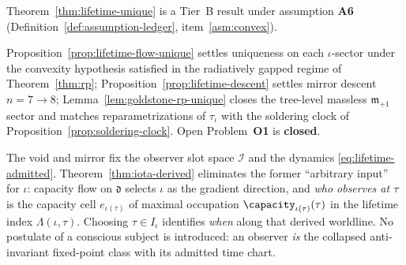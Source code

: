 \begin{remark}
\label{rem:lifetime-tier}
Theorem~\ref{thm:lifetime-unique} is a Tier~B result under assumption
\textbf{A6} (Definition~\ref{def:assumption-ledger}, item~\ref{asm:convex}).
\end{remark}

\begin{remark}
\label{rem:lifetime-full-gap}
Proposition~\ref{prop:lifetime-flow-unique} settles uniqueness on each
$\iota$-sector under the convexity hypothesis satisfied in the radiatively
gapped regime of Theorem~\ref{thm:rp}; Proposition~\ref{prop:lifetime-descent}
settles mirror descent $n=7\to8$; Lemma~\ref{lem:goldstone-rp-unique} closes
the tree-level massless $\mathfrak{m}_{+1}$ sector and matches
reparametrizations of $\tau_\iota$ with the soldering clock of
Proposition~\ref{prop:soldering-clock}. Open Problem~\textbf{O1} is
\textbf{closed}.
\end{remark}

\begin{remark}\label{rem:observer-derived}
The void and mirror fix the observer slot space $\mathcal{I}$ and the dynamics
\eqref{eq:lifetime-admitted}. Theorem~\ref{thm:iota-derived} eliminates the
former ``arbitrary input'' for $\iota$: capacity flow on $\mathfrak{d}$
selects $\iota$ as the gradient direction, and \emph{who observes at $\tau$}
is the capacity cell $e_{\iota(\tau)}$ of maximal occupation
$\capacity_{\iota(\tau)}(\tau)$ in the lifetime index
$\Lambda(\iota,\tau)$. Choosing $\tau\in I_\iota$ identifies \emph{when} along
that derived worldline. No postulate of a conscious subject is introduced: an
observer \emph{is} the collapsed anti-invariant fixed-point class with its
admitted time chart.
\end{remark}